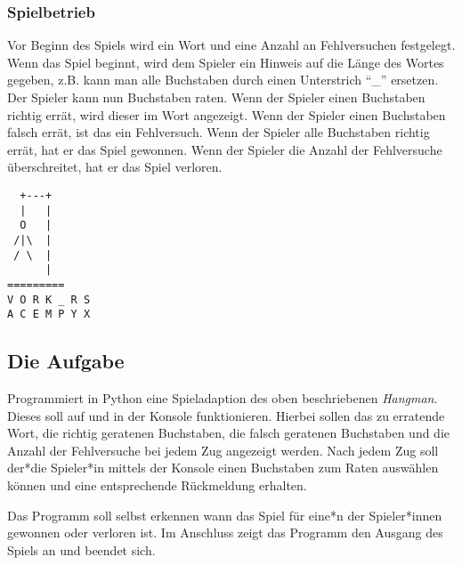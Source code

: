 \subsubsection*{Spielbetrieb}
\begin{minipage}[t]{.7\textwidth}
    Vor Beginn des Spiels wird ein Wort und eine Anzahl an Fehlversuchen festgelegt. Wenn das Spiel beginnt, wird dem Spieler ein Hinweis auf die Länge des Wortes gegeben, z.B. kann man alle Buchstaben durch einen Unterstrich \enquote{\_} ersetzen. Der Spieler kann nun Buchstaben raten. Wenn der Spieler einen Buchstaben richtig errät, wird dieser im Wort angezeigt. Wenn der Spieler einen Buchstaben falsch errät, ist das ein Fehlversuch. Wenn der Spieler alle Buchstaben richtig errät, hat er das Spiel gewonnen. Wenn der Spieler die Anzahl der Fehlversuche überschreitet, hat er das Spiel verloren.
\end{minipage}%
\begin{minipage}[t]{.3\textwidth}%
    \centering%
    \captionsetup{type=figure}
    \begin{BVerbatim}
  +---+
  |   |
  O   |
 /|\  |
 / \  |
      |
=========
V O R K _ R S
A C E M P Y X
    \end{BVerbatim}
\end{minipage}%

\subsection*{Die Aufgabe}
Programmiert in Python eine Spieladaption des oben beschriebenen \emph{Hangman}.
Dieses soll auf und in der Konsole funktionieren.
Hierbei sollen das zu erratende Wort, die richtig geratenen Buchstaben, die falsch geratenen Buchstaben und die Anzahl der Fehlversuche bei jedem Zug angezeigt werden.
Nach jedem Zug soll der*die Spieler*in mittels der Konsole einen Buchstaben zum Raten auswählen können und eine entsprechende Rückmeldung erhalten.

Das Programm soll selbst erkennen wann das Spiel für eine*n der Spieler*innen gewonnen oder verloren ist.
Im Anschluss zeigt das Programm den Ausgang des Spiels an und beendet sich.

